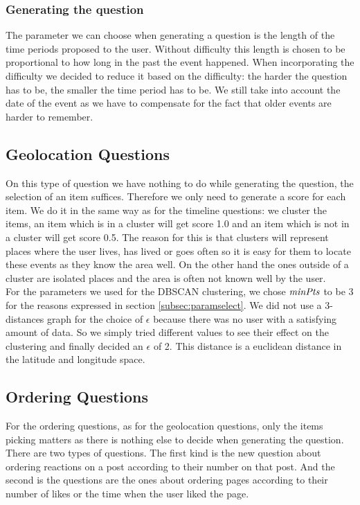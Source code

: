 \subsubsection{Generating the question}
The parameter we can choose when generating a question is the length of the time periods proposed to the user. Without difficulty this length is chosen to be proportional to how long in the past the event happened. When incorporating the difficulty we decided to reduce it based on the difficulty: the harder the question has to be, the smaller the time period has to be. We still take into account the date of the event as we have to compensate for the fact that older events are harder to remember.

\subsection{Geolocation Questions}
On this type of question we have nothing to do while generating the question, the selection of an item suffices. Therefore we only need to generate a score for each item. We do it in the same way as for the timeline questions: we cluster the items, an item which is in a cluster will get score 1.0 and an item which is not in a cluster will get score 0.5. The reason for this is that clusters will represent places where the user lives, has lived or goes often so it is easy for them to locate these events as they know the area well. On the other hand the ones outside of a cluster are isolated places and the area is often not known well by the user.\\
For the parameters we used for the DBSCAN clustering, we chose $\mathit{minPts}$ to be 3 for the reasons expressed in section \ref{subsec:paramselect}. We did not use a 3-distances graph for the choice of $\epsilon$ because there was no user with a satisfying amount of data. So we simply tried different values to see their effect on the clustering and finally decided an $\epsilon$ of 2. This distance is a euclidean distance in the latitude and longitude space.

\subsection{Ordering Questions}
For the ordering questions, as for the geolocation questions, only the items picking matters as there is nothing else to decide when generating the question. There are two types of questions. The first kind is the new question about ordering reactions on a post according to their number on that post. And the second is the questions are the ones about ordering pages according to their number of likes or the time when the user liked the page.
